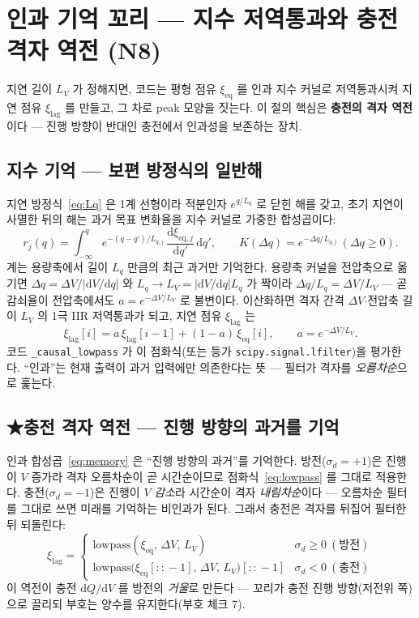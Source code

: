 \documentclass[11pt,a4paper]{article}
\newcommand{\dd}{\mathrm{d}}
\newcommand{\eq}{\mathrm{eq}}
\newcommand{\lagg}{\mathrm{lag}}
\newcommand{\sgn}{\sigma_d}
\begin{document}
\section{인과 기억 꼬리 — 지수 저역통과와 충전 격자 역전 (N8)}\label{sec:tail}
지연 길이 $L_V$ 가 정해지면, 코드는 평형 점유 $\xi_\eq$ 를 인과 지수 커널로 저역통과시켜 지연 점유 $\xi_\lagg$ 를 만들고, 그 차로 peak 모양을 짓는다. 이 절의 핵심은 \textbf{충전의 격자 역전}이다 — 진행 방향이 반대인 충전에서 인과성을 보존하는 장치.

\subsection{지수 기억 — 보편 방정식의 일반해}
지연 방정식~\eqref{eq:Lq} 은 1계 선형이라 적분인자 $e^{q/L_q}$ 로 닫힌 해를 갖고, 초기 지연이 사멸한 뒤의 해는 과거 목표 변화율을 지수 커널로 가중한 합성곱이다:
\begin{equation}
r_j(q)=\int_{-\infty}^{q}e^{-(q-q')/L_{q,j}}\,\frac{\dd\xi_{\eq,j}}{\dd q'}\,\dd q',
\qquad K(\Delta q)=e^{-\Delta q/L_{q,j}}\ (\Delta q\ge0).
\label{eq:memory}
\end{equation}
계는 용량축에서 길이 $L_q$ 만큼의 최근 과거만 기억한다. 용량축 커널을 전압축으로 옮기면 $\Delta q=\Delta V/|\dd V/\dd q|$ 와 $L_q\to L_V=|\dd V/\dd q|L_q$ 가 짝이라 $\Delta q/L_q=\Delta V/L_V$ — 곧 감쇠율이 전압축에서도 $a=e^{-\Delta V/L_V}$ 로 불변이다. 이산화하면 격자 간격 $\Delta V$$\cdot$전압축 길이 $L_V$ 의 1극 IIR 저역통과가 되고, 지연 점유 $\xi_\lagg$ 는
\begin{equation}
\xi_\lagg[i]=a\,\xi_\lagg[i-1]+(1-a)\,\xi_\eq[i],\qquad a=e^{-\Delta V/L_V}.
\label{eq:lowpass}
\end{equation}
코드 \texttt{\_causal\_lowpass} 가 이 점화식(또는 등가 \texttt{scipy.signal.lfilter})을 평가한다. ``인과''는 현재 출력이 과거 입력에만 의존한다는 뜻 — 필터가 격자를 \emph{오름차순}으로 훑는다.

\subsection{★충전 격자 역전 — 진행 방향의 과거를 기억}
인과 합성곱~\eqref{eq:memory} 은 ``진행 방향의 과거''를 기억한다. 방전($\sgn=+1$)은 진행이 $V$ 증가라 격자 오름차순이 곧 시간순이므로 점화식~\eqref{eq:lowpass} 를 그대로 적용한다. 충전($\sgn=-1$)은 진행이 $V$ \emph{감소}라 시간순이 격자 \emph{내림차순}이다 — 오름차순 필터를 그대로 쓰면 미래를 기억하는 비인과가 된다. 그래서 충전은 격자를 뒤집어 필터한 뒤 되돌린다:
\begin{equation}
\boxed{\;\xi_\lagg=\begin{cases}
\mathrm{lowpass}(\xi_\eq,\,\Delta V,\,L_V) & \sgn\ge0\ (\text{방전})\\[2pt]
\mathrm{lowpass}\big(\xi_\eq[::\!-\!1],\,\Delta V,\,L_V\big)[::\!-\!1] & \sgn<0\ (\text{충전})
\end{cases}\;}
\label{eq:reversal}
\end{equation}
이 역전이 충전 $\dd Q/\dd V$ 를 방전의 \emph{거울}로 만든다 — 꼬리가 충전 진행 방향(저전위 쪽)으로 끌리되 부호는 양수를 유지한다(부호 체크 7).
\end{document}
